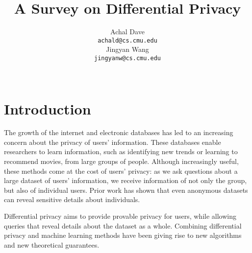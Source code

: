 \documentclass{article} %
\title{A Survey on Differential Privacy}
\author{
Achal Dave \\
\texttt{achald@cs.cmu.edu} \\
\And
Jingyan Wang \\
\texttt{jingyanw@cs.cmu.edu} \\
\\
}
\begin{document}
\maketitle

%
%
%
%
%

\section{Introduction}
The growth of the internet and electronic databases has led to an
increasing concern about the privacy of users' information. These databases
enable researchers to learn information, such as
identifying new trends or learning to recommend movies, from large
groups of people. Although increasingly useful, these methods come at the cost
of users' privacy: as we ask questions about a large dataset of users'
information, we receive information of not only the group, but also of
individual users. Prior work \cite{narayanan2008robust, sweeney1997weaving,
ganta2008composition} has shown that even anonymous datasets can reveal
sensitive details about individuals.

Differential privacy aims to provide provable privacy for users, while allowing
queries that reveal details about the dataset as a whole. Combining differential
privacy and machine learning methods have been giving rise to new algorithms and
new theoretical guarantees.
\end{document}
